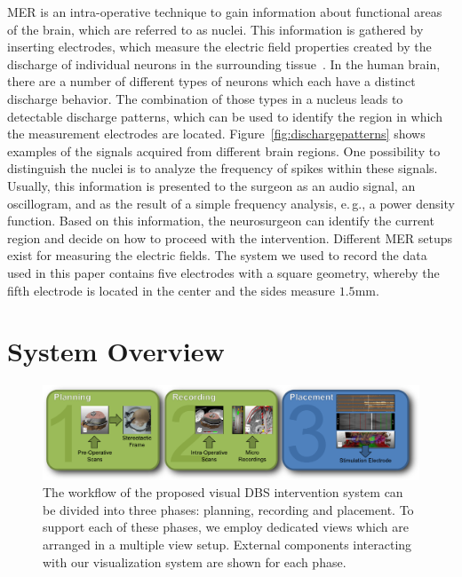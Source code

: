\documentclass{vgtc}                          %
\begin{document}
MER is an intra-operative technique to gain information about functional areas of the brain, which are referred to as nuclei. This information is gathered by inserting electrodes, which measure the electric field properties created by the discharge of individual neurons in the surrounding tissue~\cite{McIntyre2006}. In the human brain, there are a number of different types of neurons which each have a distinct discharge behavior. The combination of those types in a nucleus leads to detectable discharge patterns, which can be used to identify the region in which the measurement electrodes are located. Figure~\ref{fig:dischargepatterns} shows examples of the signals acquired from different brain regions. One possibility to distinguish the nuclei is to analyze the frequency of spikes within these signals. Usually, this information is presented to the surgeon as an audio signal, an oscillogram, and as the result of a simple frequency analysis, e.\,g., a power density function. Based on this information, the neurosurgeon can identify the current region and decide on how to proceed with the intervention. Different MER setups exist for measuring the electric fields. The system we used to record the data used in this paper contains five electrodes with a square geometry, whereby the fifth electrode is located in the center and the sides measure $1.5$mm.




\section{System Overview}\label{sec:overview}
\begin{figure}[t]
    \centering
    \includegraphics[width=0.9\linewidth]{figures/workflow}
    \caption{The workflow of the proposed visual DBS intervention system can be divided into three phases: planning, recording and placement. To support each of these phases, we employ dedicated views which are arranged in a multiple view setup. External components interacting with our visualization system are shown for each phase.}
    \label{fig:workflow}
\end{figure}
\end{document}

